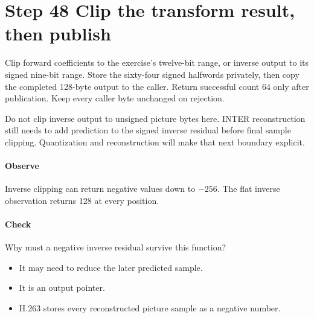 \section{Step 48 Clip the transform result, then publish}\label{h263-transform-s08}
Clip forward coefficients to the exercise's twelve-bit range, or inverse output
to its signed nine-bit range. Store the sixty-four signed halfwords privately,
then copy the completed 128-byte output to the caller. Return successful count
64 only after publication. Keep every caller byte unchanged on rejection.

Do not clip inverse output to unsigned picture bytes here. INTER reconstruction
still needs to add prediction to the signed inverse residual before final sample
clipping. Quantization and reconstruction will make that next boundary explicit.

\paragraph{Observe} Inverse clipping can return negative values down to $-256$.
The flat inverse observation returns 128 at every position.
\paragraph{Check} Why must a negative inverse residual survive this function?
\begin{itemize}
  \item[A.] It may need to reduce the later predicted sample.
  \item[B.] It is an output pointer.
  \item[C.] H.263 stores every reconstructed picture sample as a negative number.
\end{itemize}

